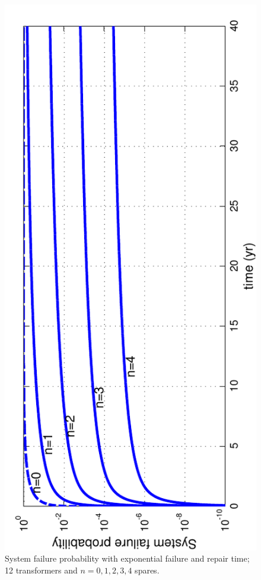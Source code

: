 \documentclass[letterpaper, 12pt]{article}
\begin{document}
\begin{figure}[h!] \centering
  \includegraphics[scale=0.8, angle=-90]{ExpFailureProb}
  \caption{System failure probability with exponential failure and repair time; 12 transformers and $n=0,1,2,3,4$ spares.\label{fig:ExpFailureProb}} 
\end{figure}
\end{document}
